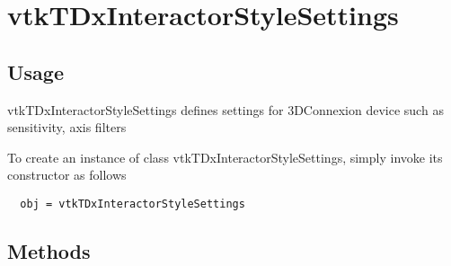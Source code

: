 \section{vtkTDxInteractorStyleSettings}

\subsection{Usage}

 vtkTDxInteractorStyleSettings defines settings for 3DConnexion device such
 as sensitivity, axis filters

To create an instance of class vtkTDxInteractorStyleSettings, simply
invoke its constructor as follows
\begin{verbatim}
  obj = vtkTDxInteractorStyleSettings
\end{verbatim}
\subsection{Methods}

